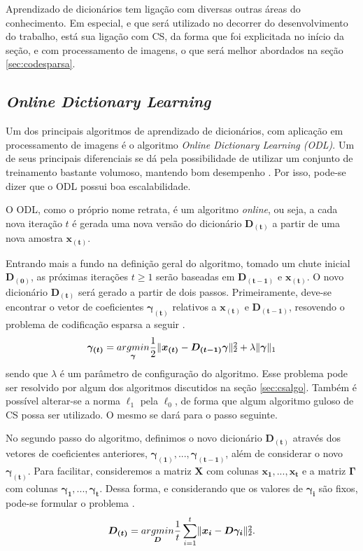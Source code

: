 \documentclass[cic,tc]{iiufrgs}
\def\SPSB#1#2{\rlap{\textsuperscript{#1}}\SB{#2}}
\def\SB#1{\textsubscript{#1}}
\renewcommand{\vec}[1]{\bm{#1}}
\newcommand{\mat}[1]{\bm{#1}}
\begin{document}
Aprendizado de dicionários tem ligação com diversas outras áreas do conhecimento. 
Em especial, e que será utilizado no decorrer do desenvolvimento do trabalho, está sua ligação
com CS, da forma que foi explicitada no início da seção, e com processamento de imagens,
o que será melhor abordados na seção \autoref{sec:codesparsa}.

\subsection{\textit{Online Dictionary Learning}}
\label{sec:odl}
Um dos principais algoritmos de aprendizado de dicionários, com aplicação em processamento de imagens
é o algoritmo \textit{Online Dictionary Learning (ODL)}. Um de seus principais diferenciais
se dá pela possibilidade de utilizar um conjunto de treinamento bastante volumoso, mantendo bom 
desempenho \cite{MairalOnlineDictLearn}.
Por isso, pode-se dizer que o ODL possui boa escalabilidade.

O ODL, como o próprio nome retrata, é um algoritmo \textit{online}, ou seja, a cada nova iteração $t$
é gerada uma nova versão do dicionário $\mat{D_{(t)}}$ a partir de uma nova amostra $\vec{x_{(t)}}$.

Entrando mais a fundo na definição geral do algoritmo, tomado um chute inicial $\mat{D_{(0)}}$, as próximas
iterações $t \ge 1$ serão baseadas em $\mat{D_{(t-1)}}$ e $\vec{x_{(t)}}$. O novo dicionário $\mat{D_{(t)}}$ será
gerado a partir de dois passos. Primeiramente, deve-se encontrar o vetor de coeficientes $\vec{\gamma_{(t)}}$
relativos a $\vec{x_{(t)}}$ e $\mat{D_{(t-1)}}$, resovendo o problema de codificação esparsa a seguir \cite{chen2015compressed}.
\begin{equation}
    \vec{\gamma_{(t)}} = \underset{\vec{\gamma}}{argmin}
    \frac{1}{2} \lVert \vec{x_{(t)}} - \mat{D_{(t-1)}}\vec{\gamma} \rVert\SPSB{2}{2} +
    \lambda \lVert \vec{\gamma} \rVert_1
\end{equation}
sendo que $\lambda$ é um parâmetro de configuração do algoritmo. Esse problema pode ser resolvido por algum dos 
algoritmos discutidos na seção \autoref{sec:csalgo}. Também é possível alterar-se a norma $\ell_1$ pela $\ell_0$,
de forma que algum algoritmo guloso de CS possa ser utilizado. O mesmo se dará para o passo seguinte.

No segundo passo do algoritmo, definimos o novo dicionário $\mat{D_{(t)}}$ através dos vetores de coeficientes
anteriores, $\vec{\gamma_{(1)}}, ..., \vec{\gamma_{(t-1)}}$, além de considerar o novo $\vec{\gamma_{(t)}}$.
Para facilitar, consideremos a matriz $\mat{X}$ com colunas $\vec{x_1},...,\vec{x_t}$ e a matriz $\mat{\Gamma}$
com colunas $\vec{\gamma_1},...,\vec{\gamma_t}$.
Dessa forma, e considerando que os valores de $\vec{\gamma_i}$ são fixos, pode-se formular o problema \cite{chen2015compressed}.
\begin{equation}
    \mat{D_{(t)}} = \underset{\mat{D}}{argmin}
    \frac{1}{t} \sum_{i=1}^t \lVert \vec{x_i} - \mat{D}\vec{\gamma_i} \rVert\SPSB{2}{2}.
\end{equation}
\end{document}
